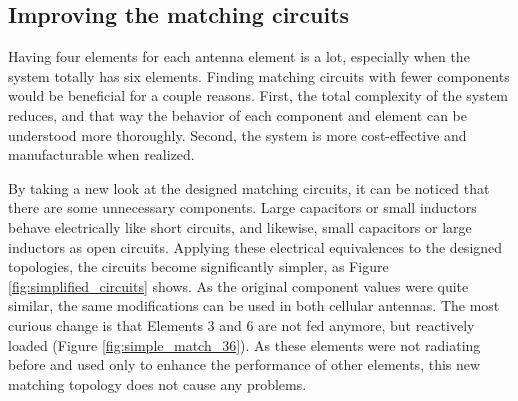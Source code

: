 \subsection{Improving the matching circuits}
\label{sec:matching_circuit}

Having four elements for each antenna element is a lot, especially when the system totally has six elements. Finding matching circuits with fewer components would be beneficial for a couple reasons. First, the total complexity of the system reduces, and that way the behavior of each component and element can be understood more thoroughly. Second, the system is more cost-effective and manufacturable when realized. 

By taking a new look at the designed matching circuits, it can be noticed that there are some unnecessary components. Large capacitors or small inductors behave electrically like short circuits, and likewise, small capacitors or large inductors as open circuits. Applying these electrical equivalences to the designed topologies, the circuits become significantly simpler, as Figure \ref{fig:simplified_circuits} shows. As the original component values were quite similar, the same modifications can be used in both cellular antennas. The most curious change is that Elements 3 and 6 are not fed anymore, but reactively loaded (Figure \ref{fig:simple_match_36}). As these elements were not radiating before and used only to enhance the performance of other elements, this new matching topology does not cause any problems. 

